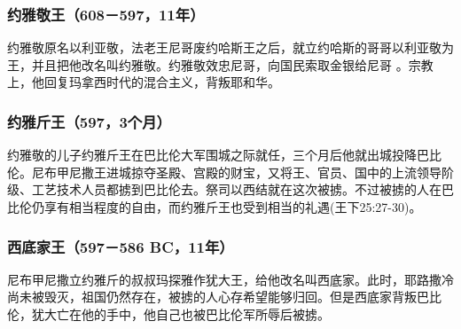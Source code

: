 \subsubsection{约雅敬王（608－597，11年）}
约雅敬原名以利亚敬，法老王尼哥废约哈斯王之后，就立约哈斯的哥哥以利亚敬为王，并且把他改名叫约雅敬。约雅敬效忠尼哥，向国民索取金银给尼哥 。宗教上，他回复玛拿西时代的混合主义，背叛耶和华。

\subsubsection{约雅斤王（597，3个月）}
约雅敬的儿子约雅斤王在巴比伦大军围城之际就任，三个月后他就出城投降巴比伦。尼布甲尼撒王进城掠夺圣殿、宫殿的财宝，又将王、官员、国中的上流领导阶级、工艺技术人员都掳到巴比伦去。祭司以西结就在这次被掳。不过被掳的人在巴比伦仍享有相当程度的自由，而约雅斤王也受到相当的礼遇(王下25:27-30)。

\subsubsection{西底家王（597－586 BC，11年）}
尼布甲尼撒立约雅斤的叔叔玛探雅作犹大王，给他改名叫西底家。此时，耶路撒冷尚未被毁灭，祖国仍然存在，被掳的人心存希望能够归回。但是西底家背叛巴比伦，犹大亡在他的手中，他自己也被巴比伦军所辱后被掳。

